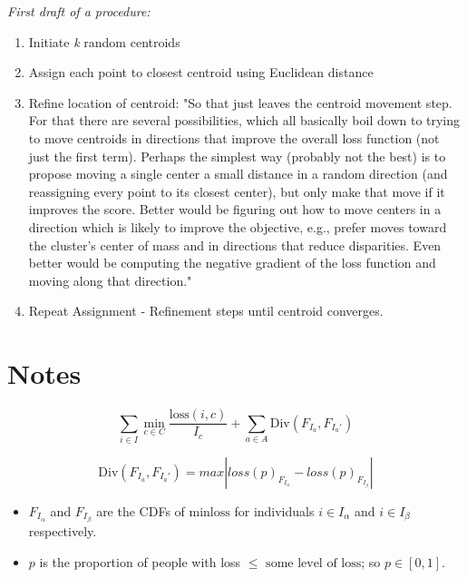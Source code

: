 \documentclass{article}
\begin{document}
\noindent \textit{First draft of a procedure:}
\begin{enumerate}
    \item Initiate \textit{k} random centroids
    \item Assign each point to closest centroid using Euclidean distance 
    \item Refine location of centroid: "So that just leaves the centroid movement step.  For that there are several possibilities, which all basically boil down to trying to move centroids in directions that improve the overall loss function (not just the first term). Perhaps the simplest way (probably not the best) is to propose moving a single center a small distance in a random direction (and reassigning every point to its closest center), but only make that move if it improves the score.  Better would be figuring out how to move centers in a direction which is likely to improve the objective, e.g., prefer moves toward the cluster's center of mass and in directions that reduce disparities.  Even better would be computing the negative gradient of the loss function and moving along that direction."
    
    \item Repeat Assignment - Refinement steps until centroid converges.
\end{enumerate}


\section{Notes}

\begin{equation}
\label{equ:obj}
\sum_{i \in I} \min_{c \in C} \frac{\mbox{loss}(i,c)}{I_c} + \sum_{a \in A} \mbox{Div}(F_{I_a},F_{I_a'})
\end{equation}


\begin{equation}
\mbox{Div}(F_{I_a},F_{I_a'}) = max|loss(p)_{F_{I_\alpha}} - loss(p)_{F_{I_\beta}}|
\end{equation}


\begin{itemize}
    \item $F_{I_\alpha}$ and $F_{I_\beta}$ are the CDFs of $\mbox{minloss}$ for individuals $i \in I_\alpha$ and $i \in I_\beta$ respectively. 
    \item $p$ is the proportion of people with loss $\leq$ $\mbox{some level of loss}$; so $p \in [0,1]$.
\end{itemize}
\end{document}
